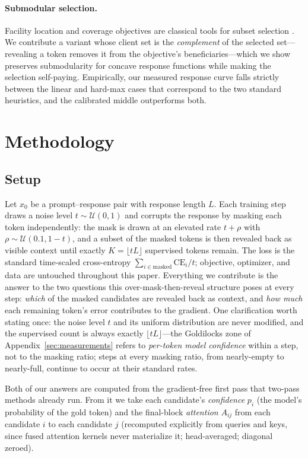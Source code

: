 \documentclass{article} %
\begin{document}
\paragraph{Submodular selection.} Facility location and coverage objectives are classical tools for subset selection \citep{nemhauser1978analysis,krause2014submodular}. We contribute a variant whose client set is the \emph{complement} of the selected set---revealing a token removes it from the objective's beneficiaries---which we show preserves submodularity for concave response functions while making the selection self-paying. Empirically, our measured response curve falls strictly between the linear and hard-max cases that correspond to the two standard heuristics, and the calibrated middle outperforms both.

\section{Methodology}

\subsection{Setup}

Let $x_0$ be a prompt--response pair with response length $L$. Each training step draws a noise level $t \sim \mathcal{U}(0,1)$ and corrupts the response by masking each token independently: the mask is drawn at an elevated rate $t + \rho$ with $\rho \sim \mathcal{U}(0.1, 1{-}t)$, and a subset of the masked tokens is then revealed back as visible context until exactly $K = \lfloor tL \rfloor$ supervised tokens remain. The loss is the standard time-scaled cross-entropy $\sum_{i \in \text{masked}} \mathrm{CE}_i / t$; objective, optimizer, and data are untouched throughout this paper. Everything we contribute is the answer to the two questions this over-mask-then-reveal structure poses at every step: \emph{which} of the masked candidates are revealed back as context, and \emph{how much} each remaining token's error contributes to the gradient. One clarification worth stating once: the noise level $t$ and its uniform distribution are never modified, and the supervised count is always exactly $\lfloor tL \rfloor$---the Goldilocks zone of Appendix~\ref{sec:measurements} refers to \emph{per-token model confidence} within a step, not to the masking ratio; steps at every masking ratio, from nearly-empty to nearly-full, continue to occur at their standard rates.

Both of our answers are computed from the gradient-free first pass that two-pass methods already run. From it we take each candidate's \emph{confidence} $p_i$ (the model's probability of the gold token) and the final-block \emph{attention} $A_{ij}$ from each candidate $i$ to each candidate $j$ (recomputed explicitly from queries and keys, since fused attention kernels never materialize it; head-averaged; diagonal zeroed).
\end{document}

